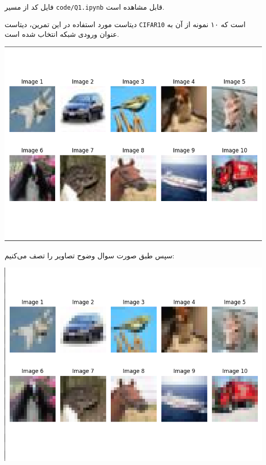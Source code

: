 \begin{qsolve}
فایل کد از مسیر \texttt{code/Q1.ipynb} قابل مشاهده است.

دیتاست مورد استفاده در این تمرین، دیتاست \texttt{CIFAR10} است که ۱۰ نمونه از آن به عنوان ورودی شبکه انتخاب شده است.

\begin{center}
	\includegraphics*[width=0.7\linewidth]{pics/img14.png}
	\label{تصاویر اصلی مورد استفاده در این سوال}
\end{center}

سپس طبق صورت سوال وضوح تصاویر را تصف می‌کنیم:

\begin{center}
	\includegraphics*[width=0.7\linewidth]{pics/img15.png}
	\label{تصاویر با وضوح نصف}
\end{center}
 
\end{qsolve}





